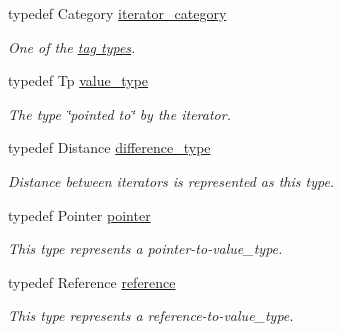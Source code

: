 \begin{DoxyCompactItemize}
\item 
typedef Category \hyperlink{structstd_1_1iterator_a588847e3b69f712ccc347e949929180a}{iterator\+\_\+category}\hypertarget{structstd_1_1iterator_a588847e3b69f712ccc347e949929180a}{}\label{structstd_1_1iterator_a588847e3b69f712ccc347e949929180a}

\begin{DoxyCompactList}\small\item\em One of the \hyperlink{}{tag types}. \end{DoxyCompactList}\item 
typedef Tp \hyperlink{structstd_1_1iterator_a0893cb10fafe13e8b53549b573e4df5b}{value\+\_\+type}\hypertarget{structstd_1_1iterator_a0893cb10fafe13e8b53549b573e4df5b}{}\label{structstd_1_1iterator_a0893cb10fafe13e8b53549b573e4df5b}

\begin{DoxyCompactList}\small\item\em The type \char`\"{}pointed to\char`\"{} by the iterator. \end{DoxyCompactList}\item 
typedef Distance \hyperlink{structstd_1_1iterator_a3c392ae28f2c2287febc9873a508a59c}{difference\+\_\+type}\hypertarget{structstd_1_1iterator_a3c392ae28f2c2287febc9873a508a59c}{}\label{structstd_1_1iterator_a3c392ae28f2c2287febc9873a508a59c}

\begin{DoxyCompactList}\small\item\em Distance between iterators is represented as this type. \end{DoxyCompactList}\item 
typedef Pointer \hyperlink{structstd_1_1iterator_adb684d0dfb0564cd8e211b11678c9864}{pointer}\hypertarget{structstd_1_1iterator_adb684d0dfb0564cd8e211b11678c9864}{}\label{structstd_1_1iterator_adb684d0dfb0564cd8e211b11678c9864}

\begin{DoxyCompactList}\small\item\em This type represents a pointer-\/to-\/value\+\_\+type. \end{DoxyCompactList}\item 
typedef Reference \hyperlink{structstd_1_1iterator_adf62b4f307d889bf965ac2cae722a035}{reference}\hypertarget{structstd_1_1iterator_adf62b4f307d889bf965ac2cae722a035}{}\label{structstd_1_1iterator_adf62b4f307d889bf965ac2cae722a035}

\begin{DoxyCompactList}\small\item\em This type represents a reference-\/to-\/value\+\_\+type. \end{DoxyCompactList}\end{DoxyCompactItemize}


